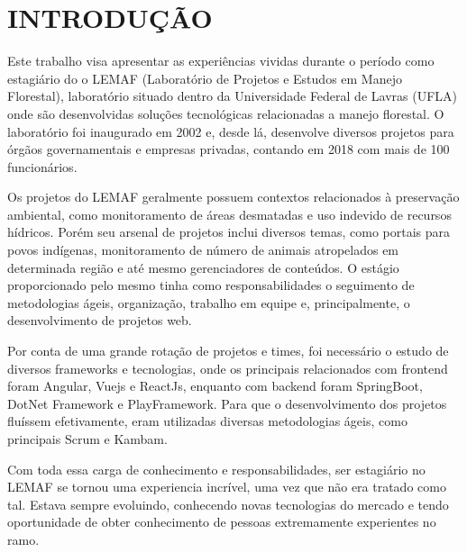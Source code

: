 \chapter{INTRODUÇÃO}
\label{cap:introducao}

Este trabalho visa apresentar as experiências vividas durante o período como estagiário do o LEMAF (Laboratório de Projetos e Estudos
em Manejo Florestal), laboratório situado dentro da Universidade Federal de Lavras (UFLA) onde são desenvolvidas soluções tecnológicas relacionadas a manejo florestal.
O laboratório foi inaugurado em 2002 e, desde lá, desenvolve diversos projetos para órgãos governamentais e empresas privadas, contando em 2018 com mais de 100 funcionários.

Os projetos do LEMAF geralmente possuem contextos relacionados à preservação ambiental, como monitoramento de áreas desmatadas e uso indevido de recursos hídricos. Porém seu arsenal de projetos inclui diversos temas, como portais para povos indígenas, monitoramento de número de animais atropelados em determinada região e até mesmo gerenciadores de conteúdos.   
O estágio proporcionado pelo mesmo tinha como responsabilidades o seguimento de metodologias ágeis, organização, trabalho em equipe e, principalmente, o desenvolvimento de projetos web.

Por conta de uma grande rotação de projetos e times, foi necessário o estudo de diversos frameworks e tecnologias, onde os principais relacionados com frontend foram Angular, Vuejs e ReactJs, enquanto com backend foram SpringBoot, DotNet Framework e PlayFramework.
Para que o desenvolvimento dos projetos fluíssem efetivamente, eram utilizadas diversas metodologias ágeis, como principais Scrum e Kambam.

Com toda essa carga de conhecimento e responsabilidades, ser estagiário no LEMAF se tornou uma experiencia incrível, uma vez que não era tratado como tal. Estava sempre evoluindo, conhecendo novas tecnologias do mercado e tendo oportunidade de obter conhecimento de pessoas extremamente experientes no ramo.